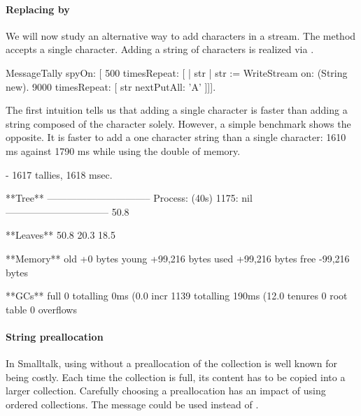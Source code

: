 \documentclass[a4paper,10pt,twoside]{book}
\begin{document}
\paragraph{Replacing  by } We will now study an alternative way to add characters in a stream. The  method accepts a single character. Adding a string of characters is realized via .

\begin{code}{}
MessageTally spyOn: 
    [ 500 timesRepeat: [
                    | str |  
                    str := WriteStream on: (String new). 
                    9000 timesRepeat: [ str nextPutAll: 'A' ]]].
\end{code}

The first intuition tells us that adding a single character is faster than adding a string composed of the character solely. However, a simple benchmark shows the opposite. It is faster to add a one character string than a single character: 1610 ms against 1790 ms while using the double of memory.

\begin{code}{}
 - 1617 tallies, 1618 msec.

**Tree**
--------------------------------
Process: (40s)  1175: nil
--------------------------------
50.8%

**Leaves**
50.8%
20.3%
18.5%

**Memory**
	old			+0 bytes
	young		+99,216 bytes
	used		+99,216 bytes
	free		-99,216 bytes

**GCs**
	full			0 totalling 0ms (0.0%
	incr		1139 totalling 190ms (12.0%
	tenures		0
	root table	0 overflows
\end{code}



\paragraph{String preallocation} In Smalltalk, using  without a preallocation of the collection is well known for being costly. Each time the collection is full, its content has to be copied into a larger collection. Carefully choosing a preallocation has an impact of using ordered collections. The message  could be used instead of .
\end{document}
